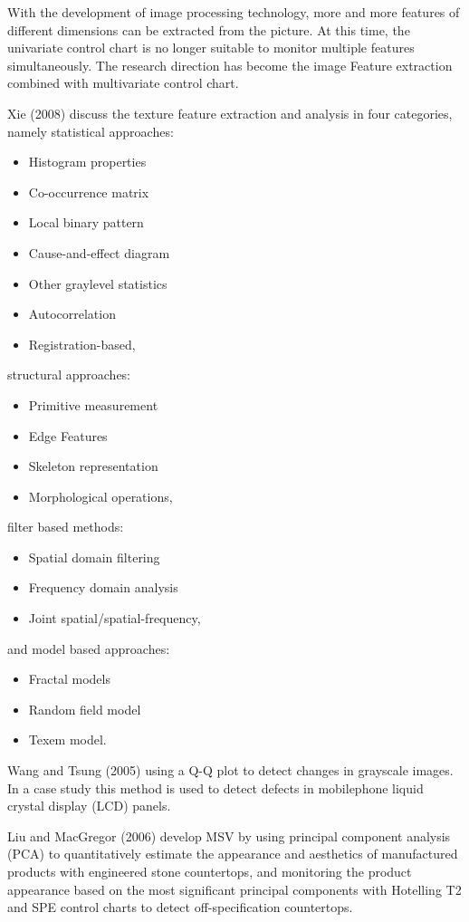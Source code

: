 With the development of image processing technology, more and more features of different dimensions can be extracted from the picture. At this time, the univariate control chart is no longer suitable to monitor multiple features simultaneously. The research direction has become the image Feature extraction combined with multivariate control chart. 


Xie (2008)\nocite{xie2008review} discuss the texture feature extraction and analysis in four categories, namely statistical approaches:
\begin{itemize}
    \item Histogram properties
    \item Co-occurrence matrix 
    \item Local binary pattern 
    \item Cause-and-effect diagram
    \item Other graylevel statistics
    \item Autocorrelation 
    \item Registration-based,
\end{itemize}
structural approaches:
\begin{itemize}
    \item Primitive measurement
    \item Edge Features 
    \item Skeleton representation
    \item Morphological operations,
\end{itemize}
filter based methods:
\begin{itemize}
    \item Spatial domain filtering 
    \item Frequency domain analysis
    \item Joint spatial/spatial-frequency,
\end{itemize}
and model based approaches:
\begin{itemize}
    \item Fractal models 
    \item Random field model
    \item Texem model.
\end{itemize}

Wang and Tsung (2005) \nocite{wang2005using} using a Q-Q plot to detect changes in grayscale images. In a case study this method is used to detect defects in mobilephone liquid crystal display (LCD) panels. 

Liu and MacGregor (2006) \nocite{liu2006estimation} develop MSV by using principal component analysis (PCA) to quantitatively
estimate the appearance and aesthetics of manufactured
products with engineered stone countertops, and monitoring the
product appearance based on the most significant
principal components with Hotelling T2 and SPE control charts to detect off-specification countertops.


